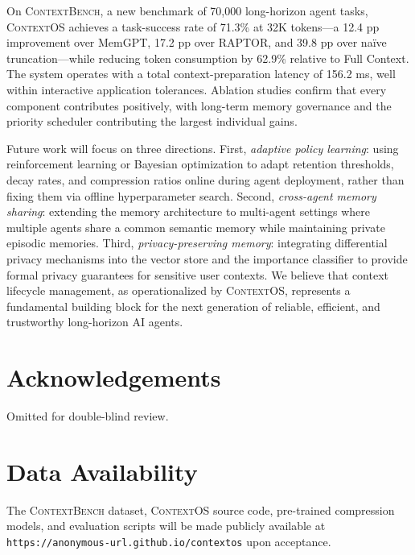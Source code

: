 \documentclass[review,12pt]{elsarticle}
\newcommand{\contextos}{\textsc{ContextOS}}
\newcommand{\contextbench}{\textsc{ContextBench}}
\begin{document}
On \contextbench{}, a new benchmark of 70,000 long-horizon agent tasks,
\contextos{} achieves a task-success rate of 71.3\% at 32K tokens—a
12.4 pp improvement over MemGPT, 17.2 pp over RAPTOR, and 39.8 pp over
na\"{i}ve truncation—while reducing token consumption by 62.9\% relative to
Full Context.  The system operates with a total context-preparation latency
of 156.2 ms, well within interactive application tolerances.  Ablation studies
confirm that every component contributes positively, with long-term memory
governance and the priority scheduler contributing the largest individual gains.

Future work will focus on three directions.  First, \textit{adaptive policy
learning}: using reinforcement learning or Bayesian optimization to adapt
retention thresholds, decay rates, and compression ratios online during agent
deployment, rather than fixing them via offline hyperparameter search.
Second, \textit{cross-agent memory sharing}: extending the memory architecture
to multi-agent settings where multiple agents share a common semantic memory
while maintaining private episodic memories.  Third, \textit{privacy-preserving
memory}: integrating differential privacy mechanisms into the vector store and
the importance classifier to provide formal privacy guarantees for sensitive
user contexts.  We believe that context lifecycle management, as operationalized
by \contextos{}, represents a fundamental building block for the next generation
of reliable, efficient, and trustworthy long-horizon AI agents.

\section*{Acknowledgements}
Omitted for double-blind review.

\section*{Data Availability}
The \contextbench{} dataset, \contextos{} source code, pre-trained compression
models, and evaluation scripts will be made publicly available at
\texttt{https://anonymous-url.github.io/contextos} upon acceptance.
\end{document}

